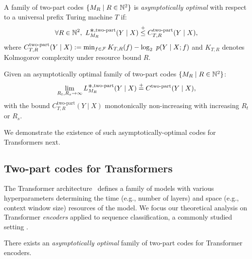 \begin{defn}
A family of two-part codes $\{ M_R \mid R \in {\mathbb{N}^2} \}$ is \emph{asymptotically optimal} with respect to a universal prefix Turing machine $T$ if:
\begin{equation}\label{eq:asymptotically-optimal-two-part-code-def}
    \forall R \in \gR,~ L^{\bigast,\text{two-part}}_{M_R}(Y \mid X) \leqc C^{\text{two-part}}_{T,R}(Y \mid X),
\end{equation}
where $C^{\text{two-part}}_{T,R}(Y \mid X) := \min_{f \in {\mathcal{F}}} K_{T,R}(f) -\log_2~p(Y \mid X;f)$ and $K_{T,R}$ denotes Kolmogorov complexity under resource bound $R$. %
\end{defn}

\begin{prop}\label{thm:asymptotically-optimal-two-part-codes}
Given an asymptotically optimal family of two-part codes $\{ M_R \mid R \in {\mathbb{N}^2} \}$:
\begin{equation}
    \lim_{R_t,R_s \rightarrow \infty} L^{\bigast,\text{two-part}}_{M_R}(Y \mid X) \eqc C^{\text{two-part}}(Y \mid X),
\end{equation}
with the bound $C^{\text{two-part}}_{T,R}(Y \mid X)$ monotonically non-increasing with increasing $R_t$ or $R_s$.
\end{prop}

We demonstrate the existence of such asymptotically-optimal codes for Transformers next.



\subsection{Two-part codes for Transformers}
\label{sec:two-part-codes-for-transformers}

The Transformer architecture~\citep{vaswani2017attention} defines a family of models with various hyperparameters determining the time (e.g., number of layers) and space (e.g., context window size) resources of the model. We focus our theoretical analysis on Transformer \emph{encoders}
applied to sequence classification, a commonly studied setting
\cite[e.g.,][]{devlin2019bert}.

\begin{thm}\label{thm:transformer-two-part-code}
There exists an \emph{asymptotically optimal} family of two-part codes for Transformer encoders.
\end{thm}

